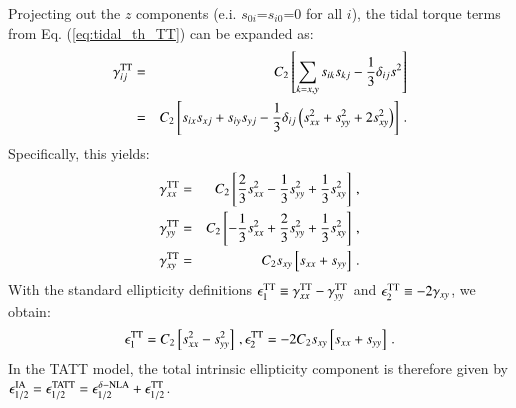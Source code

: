 \documentclass[useAMS,usenatbib]{mn2e}
\begin{document}
Projecting out the $z$ components (e.i. $s_{0i}$=$s_{i0}$=0 for all $i$),  the tidal torque terms from Eq. (\ref{eq:tidal_th_TT}) can be expanded as:
 \begin{eqnarray}
\gamma^{\rm TT}_{ij}&=& C_2 \left[\sum_{k=x,y} s_{ik} s_{kj} -\frac{1}{3} \delta_{ij} s^2\right] \\
                                  &=&C_2 \left[ s_{ix}s_{xj}  + s_{iy}s_{yj}  -  \frac{1}{3} \delta_{ij} \left( s_{xx}^2 + s_{yy}^2 +2s_{xy}^2 \right)  \right] \, .
\end{eqnarray}
Specifically, this yields:
 \begin{eqnarray}
\gamma^{\rm TT}_{xx}&=& C_2 \left[\frac{2}{3}s_{xx}^2  -  \frac{1}{3}s_{yy}^2 + \frac{1}{3}s_{xy}^2 \right]\, ,  \nonumber \\
\gamma^{\rm TT}_{yy}&=& C_2 \left[-\frac{1}{3}s_{xx}^2  +  \frac{2}{3}s_{yy}^2 + \frac{1}{3}s_{xy}^2  \right]\, , \\
\gamma^{\rm TT}_{xy}&=& C_2 s_{xy}\left[s_{xx}+s_{yy}  \right]\, . \nonumber                                  
\end{eqnarray}
With the standard ellipticity definitions $\epsilon_1^{\rm TT}\equiv \gamma_{xx}^{\rm TT} - \gamma_{yy}^{\rm TT}$ and $\epsilon_2^{\rm TT}\equiv -2 \gamma_{xy}$, we obtain:
\begin{eqnarray}
\epsilon_1^{\rm TT} = C_2  \left[ s_{xx}^2 - s_{yy}^2\right] \, , \epsilon_2^{\rm TT} = -2 C_2 s_{xy}\left[s_{xx}+s_{yy}  \right]\, .
\end{eqnarray}
In the TATT model, the total intrinsic ellipticity component is therefore given by $\epsilon_{1/2}^{\rm IA} = \epsilon_{1/2}^{\rm TATT} = \epsilon_{1/2}^{\delta{\rm-NLA}} + \epsilon_{1/2}^{\rm TT}$.


\bsp	%
\label{lastpage}
\end{document}
